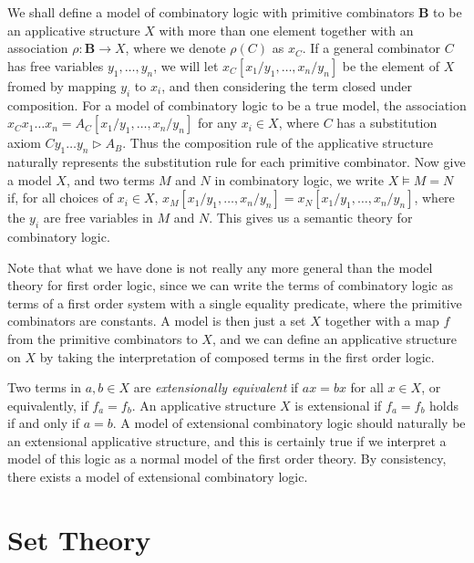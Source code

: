 We shall define a model of combinatory logic with primitive combinators $\mathbf{B}$ to be an applicative structure $X$ with more than one element together with an association $\rho: \mathbf{B} \to X$, where we denote $\rho(C)$ as $x_C$. If a general combinator $C$ has free variables $y_1, \dots, y_n$, we will let $x_C[x_1/y_1, \dots, x_n/y_n]$ be the element of $X$ fromed by mapping $y_i$ to $x_i$, and then considering the term closed under composition. For a model of combinatory logic to be a true model, the association $x_Cx_1 \dots x_n = A_C[x_1/y_1, \dots, x_n/y_n]$ for any $x_i \in X$, where $C$ has a substitution axiom $C y_1 \dots y_n \rhd A_B$. Thus the composition rule of the applicative structure naturally represents the substitution rule for each primitive combinator. Now give a model $X$, and two terms $M$ and $N$ in combinatory logic, we write $X \vDash M = N$ if, for all choices of $x_i \in X$, $x_M[x_1/y_1, \dots, x_n/y_n] = x_N[x_1/y_1, \dots, x_n/y_n]$,  where the $y_i$ are free variables in $M$ and $N$. This gives us a semantic theory for combinatory logic.

Note that what we have done is not really any more general than the model theory for first order logic, since we can write the terms of combinatory logic as terms of a first order system with a single equality predicate, where the primitive combinators are constants. A model is then just a set $X$ together with a map $f$ from the primitive combinators to $X$, and we can define an applicative structure on $X$ by taking the interpretation of composed terms in the first order logic.

Two terms in $a,b \in X$ are \emph{extensionally equivalent} if $ax = bx$ for all $x \in X$, or equivalently, if $f_a = f_b$. An applicative structure $X$ is extensional if $f_a = f_b$ holds if and only if $a = b$. A model of extensional combinatory logic should naturally be an extensional applicative structure, and this is certainly true if we interpret a model of this logic as a normal model of the first order theory. By consistency, there exists a model of extensional combinatory logic.















\part{Set Theory}


